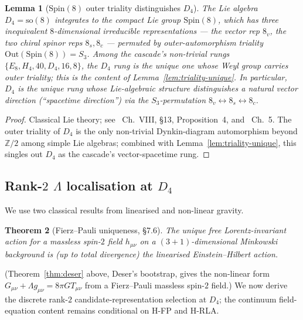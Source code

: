 \documentclass[12pt]{article}
\newtheorem{theorem}{Theorem}
\newtheorem{lemma}[theorem]{Lemma}
\theoremstyle{definition}
\theoremstyle{remark}
\begin{document}
\begin{lemma}[$\mathrm{Spin}(8)$ outer triality distinguishes $D_4$]\label{lem:spin8-triality}
The Lie algebra $D_4 = \mathrm{so}(8)$ integrates to the compact Lie group $\mathrm{Spin}(8)$, which has three inequivalent $8$-dimensional irreducible representations --- the vector rep $8_v$, the two chiral spinor reps $8_s, 8_c$ --- permuted by outer-automorphism triality $\mathrm{Out}(\mathrm{Spin}(8)) = S_3$. Among the cascade's non-trivial rungs $\{E_8, H_4, 40, D_4, 16, 8\}$, the $D_4$ rung is the unique one whose Weyl group carries outer triality; this is the content of Lemma~\ref{lem:triality-unique}. In particular, $D_4$ is the unique rung whose Lie-algebraic structure distinguishes a natural vector direction (``spacetime direction'') via the $S_3$-permutation $8_v \leftrightarrow 8_s \leftrightarrow 8_c$.
\end{lemma}

\begin{proof}
Classical Lie theory; see~\citep{Bourbaki2002} Ch.~VIII, \S13, Proposition~4, and~\citep{Adams1996} Ch.~5. The outer triality of $D_4$ is the only non-trivial Dynkin-diagram automorphism beyond $\mathbb{Z}/2$ among simple Lie algebras; combined with Lemma~\ref{lem:triality-unique}, this singles out $D_4$ as the cascade's vector-spacetime rung.
\end{proof}

\subsection{Rank-$2$ $\Lambda$ localisation at $D_4$}

We use two classical results from linearised and non-linear gravity.

\begin{theorem}[Fierz--Pauli uniqueness, \citep{Weinberg1995} \S7.6]\label{thm:FP}
The unique free Lorentz-invariant action for a massless spin-$2$ field $h_{\mu\nu}$ on a $(3+1)$-dimensional Minkowski background is (up to total divergence) the linearised Einstein--Hilbert action.
\end{theorem}

(Theorem~\ref{thm:deser} above, Deser's bootstrap, gives the non-linear form $G_{\mu\nu} + \Lambda g_{\mu\nu} = 8\pi G T_{\mu\nu}$ from a Fierz--Pauli massless spin-$2$ field.) We now derive the discrete rank-$2$ candidate-representation selection at $D_4$; the continuum field-equation content remains conditional on H-FP and H-RLA.
\end{document}
